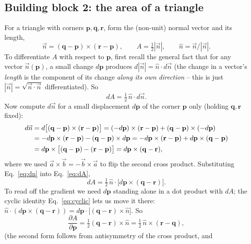 \documentclass[11pt,a4paper]{report}
\newcommand{\rvec}{\mathbf{r}}
\newcommand{\pvec}{\mathbf{p}}
\newcommand{\qvec}{\mathbf{q}}
\begin{document}
\subsection{Building block 2: the area of a triangle}
\label{sec:tri-area}
For a triangle with corners $\pvec,\qvec,\rvec$, form the (non-unit) normal
vector and its length,
\begin{equation}
  \vec n = (\qvec-\pvec)\times(\rvec-\pvec), \qquad
  A = \tfrac12 |\vec n|, \qquad
  \hat n = \vec n / |\vec n| .
\end{equation}
To differentiate $A$ with respect to $\pvec$, first recall the general
fact that for any vector $\vec n(\pvec)$, a small change $d\pvec$ produces
$d|\vec n| = \hat n \cdot d\vec n$ (the change in a vector's \emph{length}
is the component of its change \emph{along its own direction} -- this
is just $|\vec n|=\sqrt{\vec n\cdot\vec n}$ differentiated). So
\begin{equation}
  dA = \tfrac12\, \hat n \cdot d\vec n .
  \label{eq:dA}
\end{equation}
Now compute $d\vec n$ for a small displacement $d\pvec$ of the corner
$\pvec$ only (holding $\qvec,\rvec$ fixed):
\begin{align}
  d\vec n &= d\bigl[(\qvec-\pvec)\times(\rvec-\pvec)\bigr]
          = (-d\pvec)\times(\rvec-\pvec) + (\qvec-\pvec)\times(-d\pvec) \notag\\
          &= -d\pvec\times(\rvec-\pvec) - (\qvec-\pvec)\times d\pvec
           = -d\pvec\times(\rvec-\pvec) + d\pvec\times(\qvec-\pvec) \notag\\
          &= d\pvec\times\bigl[(\qvec-\pvec)-(\rvec-\pvec)\bigr]
           = d\pvec\times(\qvec-\rvec),
  \label{eq:dn}
\end{align}
where we used $\vec a\times\vec b=-\vec b\times \vec a$ to flip the second
cross product. Substituting Eq.~\ref{eq:dn} into Eq.~\ref{eq:dA},
\begin{equation}
  dA = \tfrac12\, \hat n \cdot \bigl[d\pvec\times(\qvec-\rvec)\bigr] .
\end{equation}
To read off the gradient we need $d\pvec$ standing alone in a dot
product with $dA$; the cyclic identity Eq.~\ref{eq:cyclic} lets us move
it there: $\hat n\cdot(d\pvec\times(\qvec-\rvec)) = d\pvec\cdot\bigl[(\qvec-\rvec)\times\hat n\bigr]$.
So
\begin{equation}
  \frac{\partial A}{\partial \pvec} = \tfrac12 (\qvec-\rvec)\times\hat n
  = \tfrac12\, \hat n\times(\rvec-\qvec),
\end{equation}
(the second form follows from antisymmetry of the cross product, and
\end{document}
